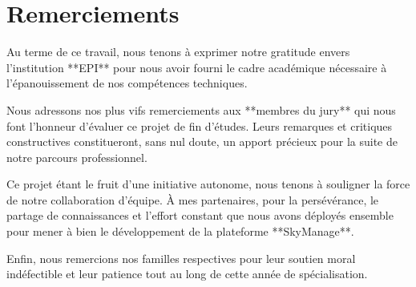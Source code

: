 \chapter*{Remerciements}
\thispagestyle{empty}

Au terme de ce travail, nous tenons à exprimer notre gratitude envers l'institution **EPI** pour nous avoir fourni le cadre académique nécessaire à l'épanouissement de nos compétences techniques.

Nous adressons nos plus vifs remerciements aux **membres du jury** qui nous font l’honneur d’évaluer ce projet de fin d’études. Leurs remarques et critiques constructives constitueront, sans nul doute, un apport précieux pour la suite de notre parcours professionnel.

Ce projet étant le fruit d'une initiative autonome, nous tenons à souligner la force de notre collaboration d'équipe. À mes partenaires, pour la persévérance, le partage de connaissances et l'effort constant que nous avons déployés ensemble pour mener à bien le développement de la plateforme **SkyManage**.

Enfin, nous remercions nos familles respectives pour leur soutien moral indéfectible et leur patience tout au long de cette année de spécialisation.

\newpage